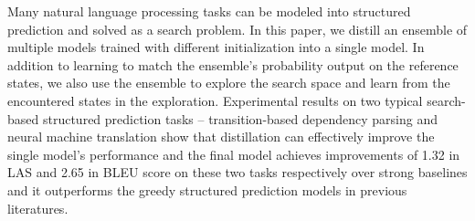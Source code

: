 Many natural language processing tasks can be modeled into structured prediction and solved as a  search problem. In this paper, we distill an ensemble of multiple models trained with different initialization into a single model. In addition to learning to match the ensemble's probability output on the reference states, we also use the ensemble to explore the search space and learn from the encountered states in the exploration. Experimental results on two typical search-based structured prediction tasks -- transition-based dependency parsing and neural machine translation show that distillation can effectively improve the single model's performance and the final model achieves improvements of 1.32 in LAS and 2.65 in BLEU score on these two tasks respectively over strong baselines and it outperforms the greedy structured prediction models in previous literatures.
